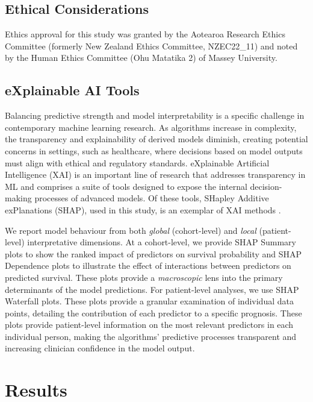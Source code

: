 \documentclass{article}
\begin{document}
\subsection{Ethical Considerations}
Ethics approval for this study was granted by the Aotearoa Research Ethics Committee  (formerly New Zealand Ethics Committee, NZEC22\_11) and noted by the Human Ethics Committee  (Ohu Matatika 2) of Massey University.

\subsection{eXplainable AI Tools}


Balancing predictive strength and model interpretability is a specific challenge in contemporary machine learning research. As algorithms increase in complexity, the transparency and explainability of derived models diminish, creating potential concerns in settings, such as healthcare, where decisions based on model outputs must align with ethical and regulatory standards. eXplainable Artificial Intelligence (XAI) is an important line of research that addresses transparency in ML and comprises a suite of tools designed to expose the internal decision-making processes of advanced models. Of these tools, SHapley Additive exPlanations (SHAP), used in this study, is an exemplar of XAI methods \cite{gramegna2021shap, Lundberg2017}.

We report model behaviour from both \textit{global} (cohort-level) and \textit{local} (patient-level) interpretative dimensions. At a cohort-level, we provide SHAP Summary plots to show the ranked impact of predictors on survival probability and SHAP Dependence plots to illustrate the effect of interactions between predictors on predicted survival. These plots provide a \textit{macroscopic} lens into the primary determinants of the model predictions. For patient-level analyses, we use SHAP Waterfall plots. These plots provide a granular examination of individual data points, detailing the contribution of each predictor to a specific prognosis.  These plots provide patient-level information on the most relevant predictors in each individual person, making the algorithms' predictive processes transparent and increasing clinician confidence in the model output.


\section{Results}
\end{document}
